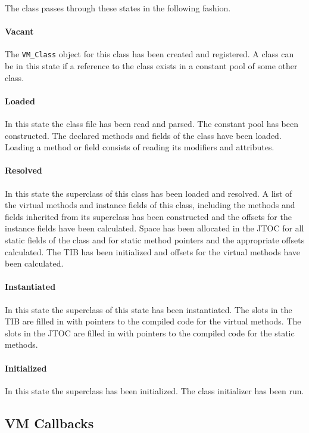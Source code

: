 The class passes through these states in the following fashion.

\paragraph{Vacant}
The {\tt VM\_Class} object for this class has been created and registered. 
A class can be in this state if a reference to the class exists in a constant
pool of some other class.

\paragraph{Loaded} 
In this state the class file has been read and parsed.  The constant pool has 
been constructed. The declared methods and fields of the class have been loaded.
Loading a method or field consists of reading its modifiers and attributes.

\paragraph{Resolved}
In this state the superclass of this class has been loaded and resolved. 
A list of the virtual methods and instance fields of this class, including the 
methods and fields
inherited from its superclass has been constructed and the offsets for the 
instance fields have been calculated.  
Space has been allocated in the JTOC for all static fields of the class and for
static method pointers and the appropriate offsets calculated.
The TIB has been initialized and offsets for the virtual methods have been
calculated.

\paragraph{Instantiated}
In this state the superclass of this state has been instantiated. 
The slots in the TIB are filled in with pointers to the compiled code for the 
virtual methods. 
The slots in the JTOC are filled in with pointers to the compiled code for the 
static methods.

\paragraph{Initialized} 
In this state the superclass has been initialized. The class initializer has 
been run. 

\subsection{VM Callbacks}\label{sssec:callbacks}

